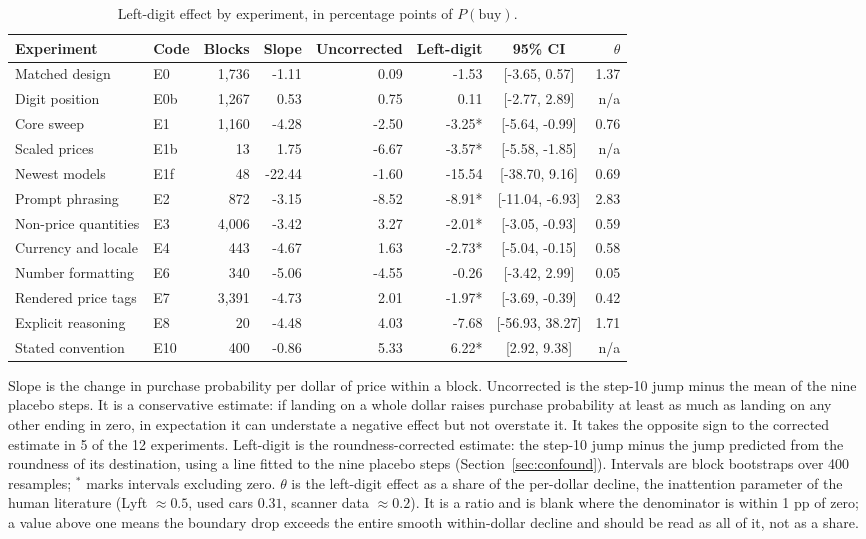 \begin{table}[t]
\centering
\caption{Left-digit effect by experiment, in percentage points of $P(\text{buy})$.}
\label{tab:main}
\small
\begin{tabular}{@{}llrrrrcr@{}}
\toprule
Experiment & Code & Blocks & Slope & Uncorrected & Left-digit & 95\% CI & $\theta$ \\
\midrule
Matched design & E0 & 1,736 & -1.11 & 0.09 & -1.53 & [-3.65, 0.57] & 1.37 \\
Digit position & E0b & 1,267 & 0.53 & 0.75 & 0.11 & [-2.77, 2.89] & n/a \\
Core sweep & E1 & 1,160 & -4.28 & -2.50 & -3.25* & [-5.64, -0.99] & 0.76 \\
Scaled prices & E1b &    13 & 1.75 & -6.67 & -3.57* & [-5.58, -1.85] & n/a \\
Newest models & E1f &    48 & -22.44 & -1.60 & -15.54 & [-38.70, 9.16] & 0.69 \\
Prompt phrasing & E2 &   872 & -3.15 & -8.52 & -8.91* & [-11.04, -6.93] & 2.83 \\
Non-price quantities & E3 & 4,006 & -3.42 & 3.27 & -2.01* & [-3.05, -0.93] & 0.59 \\
Currency and locale & E4 &   443 & -4.67 & 1.63 & -2.73* & [-5.04, -0.15] & 0.58 \\
Number formatting & E6 &   340 & -5.06 & -4.55 & -0.26 & [-3.42, 2.99] & 0.05 \\
Rendered price tags & E7 & 3,391 & -4.73 & 2.01 & -1.97* & [-3.69, -0.39] & 0.42 \\
Explicit reasoning & E8 &    20 & -4.48 & 4.03 & -7.68 & [-56.93, 38.27] & 1.71 \\
Stated convention & E10 &   400 & -0.86 & 5.33 & 6.22* & [2.92, 9.38] & n/a \\
\bottomrule
\end{tabular}
\vspace{2pt}
\parbox{\linewidth}{\footnotesize Slope is the change in purchase probability per dollar of price within a block. Uncorrected is the step-10 jump minus the mean of the nine placebo steps. It is a conservative estimate: if landing on a whole dollar raises purchase probability at least as much as landing on any other ending in zero, in expectation it can understate a negative effect but not overstate it. It takes the opposite sign to the corrected estimate in 5 of the 12 experiments. Left-digit is the roundness-corrected estimate: the step-10 jump minus the jump predicted from the roundness of its destination, using a line fitted to the nine placebo steps (Section~\ref{sec:confound}). Intervals are block bootstraps over 400 resamples; $^{*}$ marks intervals excluding zero. $\theta$ is the left-digit effect as a share of the per-dollar decline, the inattention parameter of the human literature (Lyft $\approx 0.5$, used cars $0.31$, scanner data $\approx 0.2$). It is a ratio and is blank where the denominator is within 1 pp of zero; a value above one means the boundary drop exceeds the entire smooth within-dollar decline and should be read as all of it, not as a share.}
\end{table}
